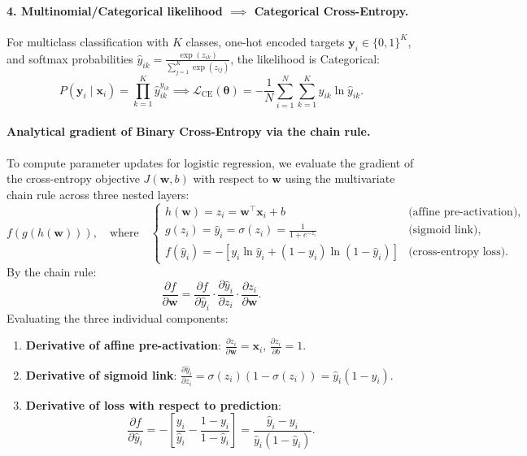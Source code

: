 \paragraph{4. Multinomial/Categorical likelihood $\implies$ Categorical Cross-Entropy.}
For multiclass classification with $K$ classes, one-hot encoded targets $\mathbf{y}_i \in \{0, 1\}^K$, and softmax probabilities $\hat{y}_{ik} = \frac{\exp(z_{ik})}{\sum_{j=1}^K \exp(z_{ij})}$, the likelihood is Categorical:
\begin{equation}
P(\mathbf{y}_i \mid \mathbf{x}_i) = \prod_{k=1}^K \hat{y}_{ik}^{y_{ik}} \implies \mathcal{L}_{\text{CE}}(\boldsymbol{\theta}) = -\frac{1}{N} \sum_{i=1}^N \sum_{k=1}^K y_{ik} \ln \hat{y}_{ik}.
\label{eq:categorical_cross_entropy_ch3}
\end{equation}

\paragraph{Analytical gradient of Binary Cross-Entropy via the chain rule.}
To compute parameter updates for logistic regression, we evaluate the gradient of the cross-entropy objective $J(\mathbf{w}, b)$ with respect to $\mathbf{w}$ using the multivariate chain rule across three nested layers:
\begin{equation}
f(g(h(\mathbf{w}))), \quad \text{where} \quad \begin{cases}
h(\mathbf{w}) = z_i = \mathbf{w}^\top \mathbf{x}_i + b & \text{(affine pre-activation)}, \\
g(z_i) = \hat{y}_i = \sigma(z_i) = \frac{1}{1 + e^{-z_i}} & \text{(sigmoid link)}, \\
f(\hat{y}_i) = -\left[ y_i \ln \hat{y}_i + (1 - y_i) \ln(1 - \hat{y}_i) \right] & \text{(cross-entropy loss)}.
\end{cases}
\end{equation}
By the chain rule:
\begin{equation}
\frac{\partial f}{\partial \mathbf{w}} = \frac{\partial f}{\partial \hat{y}_i} \cdot \frac{\partial \hat{y}_i}{\partial z_i} \cdot \frac{\partial z_i}{\partial \mathbf{w}}.
\label{eq:chain_rule_decomposition}
\end{equation}
Evaluating the three individual components:
\begin{enumerate}[noitemsep,topsep=2pt,parsep=0pt,partopsep=0pt]
  \item \textbf{Derivative of affine pre-activation}: $\frac{\partial z_i}{\partial \mathbf{w}} = \mathbf{x}_i$, $\frac{\partial z_i}{\partial b} = 1$.
  \item \textbf{Derivative of sigmoid link}: $\frac{\partial \hat{y}_i}{\partial z_i} = \sigma(z_i)(1 - \sigma(z_i)) = \hat{y}_i(1 - \hat{y}_i)$.
  \item \textbf{Derivative of loss with respect to prediction}:
    \begin{equation}
    \frac{\partial f}{\partial \hat{y}_i} = -\left[ \frac{y_i}{\hat{y}_i} - \frac{1 - y_i}{1 - \hat{y}_i} \right] = \frac{\hat{y}_i - y_i}{\hat{y}_i(1 - \hat{y}_i)}.
    \end{equation}
\end{enumerate}

